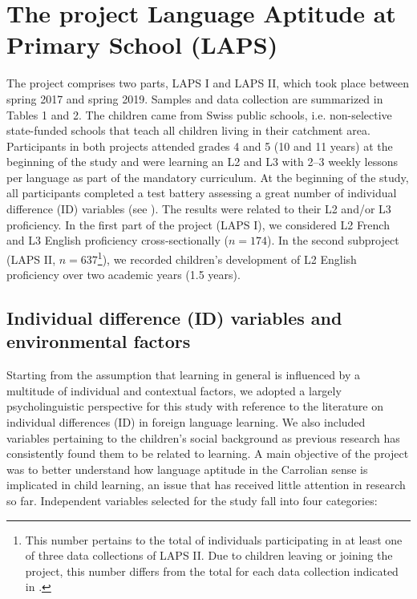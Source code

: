 \documentclass[output=paper]{langsci/langscibook}
\begin{document}
\section{The project Language Aptitude at Primary School (LAPS)}

The project comprises two parts, LAPS I and LAPS II, which took place between spring 2017 and spring 2019. Samples and data collection are summarized in Tables 1 and 2. The children came from Swiss public schools, i.e. non-selective state-funded schools that teach all children living in their catchment area. Participants in both projects attended grades 4 and 5 (10 and 11 years) at the beginning of the study and were learning an L2 and L3 with 2--3 weekly lessons per language as part of the mandatory curriculum. At the beginning of the study, all participants completed a test battery assessing a great number of individual difference (ID) variables (see ). The results were related to their L2 and/or L3 proficiency. In the first part of the project (LAPS I), we considered L2 French and L3 English proficiency cross-sectionally ($n=174$). In the second subproject (LAPS II, $n=637$\footnote{This number pertains to the total of individuals participating in at least one of three data collections of LAPS II. Due to children leaving or joining the project, this number differs from the total for each data collection indicated in .}), we recorded children’s development of L2 English proficiency over two academic years (1.5 years).

\subsection{Individual difference (ID) variables and environmental factors}

Starting from the assumption that learning in general is influenced by a multitude of individual and contextual factors, we adopted a largely psycholinguistic perspective for this study with reference to the literature on individual differences (ID) in foreign language learning. We also included variables pertaining to the children’s social background as previous research has consistently found them to be related to learning. A main objective of the project was to better understand how language aptitude in the Carrolian sense is implicated in child learning, an issue that has received little attention in research so far. Independent variables selected for the study fall into four categories:
\end{document}
